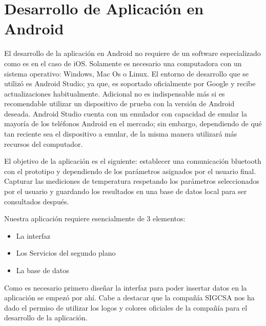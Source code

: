 \section{Desarrollo de Aplicación en Android}

\par 
El desarrollo de la aplicación en Android no requiere de un software especializado como es en el caso de iOS. Solamente es necesario una computadora con un sistema operativo: Windows, Mac Os o Linux. El entorno de desarrollo que se utilizó es Android Studio; ya que, es soportado oficialmente por Google y recibe actualizaciones habitualmente. Adicional no es indispensable más si es recomendable utilizar un dispositivo de prueba con la versión de Android deseada. Android Studio cuenta con un emulador con capacidad de emular la mayoría de los teléfonos Android en el mercado; sin embargo, dependiendo de qué tan reciente sea el dispositivo a emular, de la misma manera utilizará más recursos del computador.

\clearpage

\par \noindent
El objetivo de la aplicación es el siguiente: establecer una comunicación bluetooth con el prototipo y dependiendo de los parámetros asignados por el usuario final. Capturar las mediciones de temperatura respetando los parámetros seleccionados por el usuario y guardando los resultados en una base de datos local para ser consultados después.

\par \noindent
Nuestra aplicación requiere esencialmente de 3 elementos: 

\begin{itemize}
	\item La interfaz
	\item Los Servicios del segundo plano
	\item La base de datos
\end{itemize}

\par \noindent
Como es necesario primero diseñar la interfaz para poder insertar datos en la aplicación se empezó por ahí. Cabe a destacar que la compañía SIGCSA nos ha dado el permiso de utilizar los logos y colores oficiales de la compañía para el desarrollo de la aplicación.








